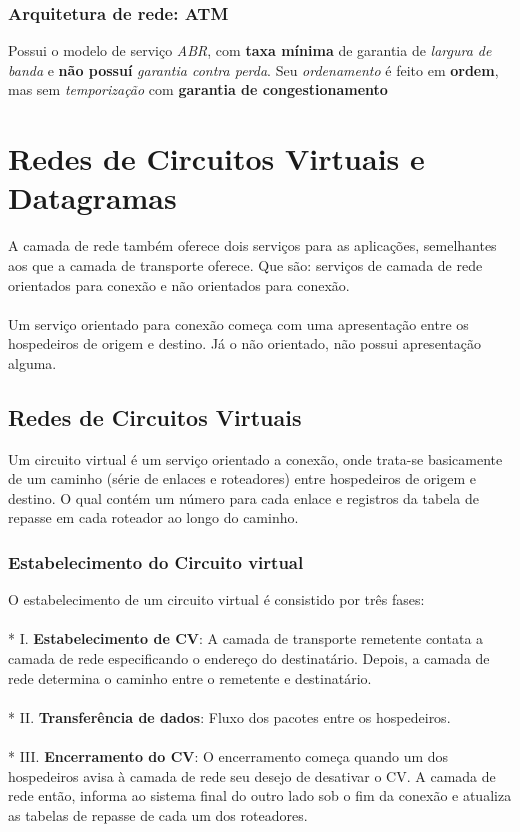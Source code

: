 \documentclass[a4paper, 12pt]{article}
\begin{document}
    \subsubsection{Arquitetura de rede: ATM}
    Possui o modelo de serviço \textit{ABR}, com \textbf{taxa mínima} de garantia de \textit{largura de banda} e \textbf{não possuí} 
    \textit{garantia contra perda}.
    Seu \textit{ordenamento} é feito em \textbf{ordem}, mas sem \textit{temporização} com \textbf{garantia de congestionamento} 

\newpage

\section{Redes de Circuitos Virtuais e Datagramas}
A camada de rede também oferece dois serviços para as aplicações, semelhantes aos que a camada de transporte oferece. Que são: serviços 
de camada de rede orientados para conexão e não orientados para conexão.
\\
\\
Um serviço orientado para conexão começa com uma apresentação entre os hospedeiros de origem e destino. Já o não orientado, não possui 
apresentação alguma.
\subsection{Redes de Circuitos Virtuais}
Um circuito virtual é um serviço orientado a conexão, onde trata-se basicamente de um caminho (série de enlaces e roteadores) entre 
hospedeiros de origem e destino. O qual contém um número para cada enlace e registros da tabela de repasse em cada roteador ao longo do caminho.

    \subsubsection{Estabelecimento do Circuito virtual}
    O estabelecimento de um circuito virtual é consistido por três fases:
        \\\\*
        I. \textbf{Estabelecimento de CV}: A camada de transporte remetente contata a camada de rede especificando o endereço do destinatário.
        Depois, a camada de rede determina o caminho entre o remetente e destinatário.
        \\\\*
        II. \textbf{Transferência de dados}: Fluxo dos pacotes entre os hospedeiros.
        \\\\*
        III. \textbf{Encerramento do CV}: O encerramento começa quando um dos hospedeiros avisa à camada de rede seu desejo de desativar o CV.
        A camada de rede então, informa ao sistema final do outro lado sob o fim da conexão e atualiza as tabelas de repasse de cada um dos
        roteadores.
\end{document}
